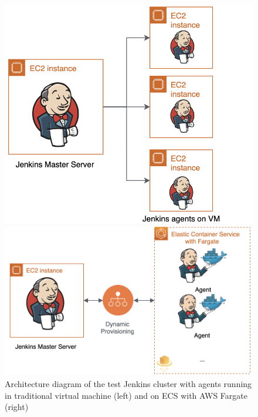 \begin{figure}[h]
    \centering
    \begin{minipage}{0.45\textwidth}
        \centering
        \includegraphics[width=\textwidth]{pics/jenkins-on-vm.png} %
    \end{minipage}\hfill
    \begin{minipage}{0.54\textwidth}
        \centering
        \includegraphics[width=\textwidth]{pics/jenkins-on-fargate.png} %
    \end{minipage}
    \label{fig:ex1}
    \caption{Architecture diagram of the test Jenkins cluster with agents running in traditional virtual machine (left) and on ECS with AWS Fargate (right)}
\end{figure}
